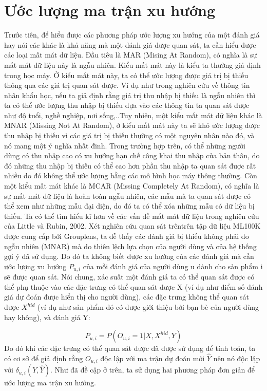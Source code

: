 \section{Ước lượng ma trận xu hướng}
Trước tiên, để hiểu được các phương pháp ước lượng xu hướng của một đánh giá hay nói các khác là khả năng mà một đánh giá được quan sát, ta cần hiểu được các loại mất mát dữ liệu. Đầu tiêu là MAR (Mising At Random), có nghĩa là sự mất mát dữ liệu này là ngẫu nhiên. Kiểu mất mát này là kiểu ta thường giả định trong học máy. Ở kiểu mất mát này, ta có thể ước lượng được giá trị bị thiếu thông qua các giá trị quan sát được. Ví dụ như trong nghiên cứu về thông tin nhân khẩu học, nếu ta giả định rằng giá trị thu nhập bị thiếu là ngẫu nhiên thì ta có thể ước lượng thu nhập bị thiếu dựa vào các thông tin ta quan sát được như độ tuổi, nghề nghiệp, nơi sống,..Tuy nhiên,  một kiểu mất mát dữ liệu khác là MNAR (Missing Not At Random), ở kiểu mất mát này ta sẽ khó ước lượng được thu nhập bị thiếu vì các giá trị bị thiếu thường có một nguyên nhân nào đó, và nó mang một ý nghĩa nhất đinh. Trong trường hợp trên, có thể những người dùng có thu nhập cao có xu hướng hạn chế công khai thu nhập của bản thân, do đó những thu nhập bị thiếu có thể cao hơn phần thu nhập ta quan sát được rất nhiều do đó không thể ước lượng bằng các mô hình học máy thông thường. Còn một kiểu mất mát khác là MCAR (Missing Completely At Random), có nghĩa là sự mất mát dữ liệu là hoàn toàn ngẫu nhiên, các mẫu mà ta quan sát được có thể xem như những mẫu đại diện, do đó ta có thể xóa những mẫu có dữ liệu bị thiếu. Ta có thể tìm hiểu kĩ hơn về các vấn đề mất mát dữ liệu trong nghiên cứu của Little và Rubin, 2002.
Xét nghiên cứu quan sát trêntrên tập dữ liệu ML100K được cung cấp bởi Grouplens, ta dễ thấy các đánh giá bị thiếu không phải do ngẫu nhiên (MNAR) mà do thiên lệch lựa chọn của người dùng và của hệ thống gợi ý đã sử dụng. Do đó ta không biết được xu hướng của các đánh giá mà  cần ước lượng xu hướng $P_{u,i}$ của mỗi đánh giá của người dùng u dành cho sản phẩm i sẽ được quan sát. Nói chung, xác suất một đánh giá ta có thể quan sát được có thể phụ thuộc vào các đặc trưng có thể quan sát được X (ví dụ như điểm số đánh giá dự đoán được hiển thị cho người dùng), các đặc trưng không thể quan sát được $X^{hid}$ (ví dụ như sản phẩm đó có được giới thiệu bởi bạn bè của người dùng hay không), và đánh giá Y:

\begin{equation}
\label{eq:pui}
    P_{u,i}=P(O_{u,i} = 1|X, X^{hid},Y)
\end{equation}
Do đó khi các đặc trưng có thể quan sát được đã được sử dụng để tính toán, ta có cơ sở để giả định rằng $O_{u,i}$ độc lập với ma trận dự đoán mới $\hat{Y}$ nên nó độc lập với $\delta_{u,i}(Y,\hat{Y})$. Như đã đề cập ở trên, ta sử dụng hai phương pháp đơn giản để ước lượng ma trận xu hướng.


